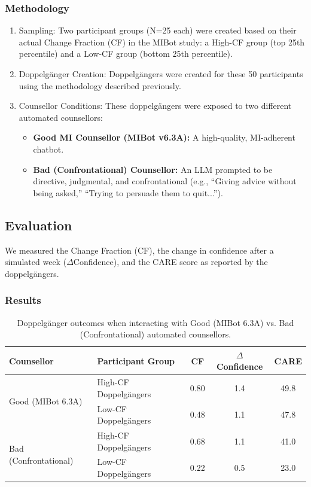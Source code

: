 \subsubsection{Methodology}

\begin{enumerate}
    \item Sampling: Two participant groups (N=25 each) were created based on their actual Change Fraction (CF) in the MIBot study: a High-CF group (top 25th percentile) and a Low-CF group (bottom 25th percentile).

    \item Doppelgänger Creation: Doppelgängers were created for these 50 participants using the methodology described previously.
    
    \item Counsellor Conditions: These doppelgängers were exposed to two different automated counsellors:
    \begin{itemize}
        \item \textbf{Good MI Counsellor (MIBot v6.3A):} A high-quality, MI-adherent chatbot.
        
        \item \textbf{Bad (Confrontational) Counsellor:} An LLM prompted to be directive, judgmental, and confrontational (e.g., ``Giving advice without being asked,'' ``Trying to persuade them to quit...'').
    \end{itemize}
\end{enumerate}

\subsection{Evaluation}
We measured the Change Fraction (CF), the change in confidence after a simulated week ($\Delta$Confidence), and the CARE score as reported by the doppelgängers.

\subsubsection{Results}

\begin{table}[ht!]
\centering

\begin{tabular}{@{}llccc@{}}
\toprule
\textbf{Counsellor} & \textbf{Participant Group} & \textbf{CF} & \textbf{$\Delta$Confidence} & \textbf{CARE} \\ \midrule
\multirow{2}{*}{Good (MIBot 6.3A)} & High-CF Doppelgängers & 0.80 & 1.4 & 49.8 \\
& Low-CF Doppelgängers & 0.48 & 1.1 & 47.8 \\ \midrule
\multirow{2}{*}{Bad (Confrontational)} & High-CF Doppelgängers & 0.68 & 1.1 & 41.0 \\
& Low-CF Doppelgängers & 0.22 & 0.5 & 23.0 \\ \bottomrule
\end{tabular}
\caption{Doppelgänger outcomes when interacting with Good (MIBot 6.3A) vs. Bad (Confrontational) automated counsellors.}
\label{tab:good-vs-bad-counselling}
\end{table}

